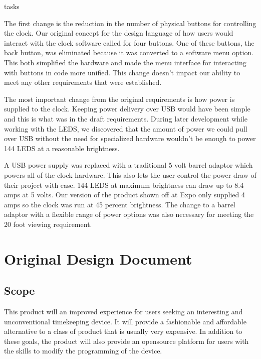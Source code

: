 tasks\documentclass[onecolumn, draftclsnofoot,10pt, compsoc]{IEEEtran}
\begin{document}
The first change is the reduction in the number of physical buttons for controlling the clock. Our original concept for the design language of how users would interact with the clock software called for four buttons. One of these buttons, the back button, was eliminated because it was converted to a software menu option. This both simplified the hardware and made the menu interface for interacting with buttons in code more unified. This change doesn’t impact our ability to meet any other requirements that were established.

The most important change from the original requirements is how power is supplied to the clock. Keeping power delivery over USB would have been simple and this is what was in the draft requirements. During later development while working with the LEDS, we discovered that the amount of power we could pull over USB without the need for specialized hardware wouldn’t be enough to power 144 LEDS at a reasonable brightness.

A USB power supply was replaced with a traditional 5 volt barrel adaptor which powers all of the clock hardware. This also lets the user control the power draw of their project with ease. 144 LEDS at maximum brightness can draw up to 8.4 amps at 5 volts. Our version of the product shown off at Expo only supplied 4 amps so the clock was run at 45 percent brightness. The change to a barrel adaptor with a flexible range of power options was also necessary for meeting the 20 foot viewing requirement.


\section{Original Design Document}
\subsection{Scope}
This product will an improved experience for users seeking an interesting and unconventional timekeeping device.
It will provide a fashionable and affordable alternative to a class of product that is usually very expensive.
In addition to these goals, the product will also provide an opensource platform for users with the skills to modify the programming of the device.
\end{document}

